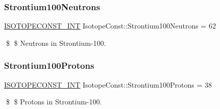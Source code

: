 \subsubsection{\texorpdfstring{Strontium100\+Neutrons}{Strontium100Neutrons}}
{\footnotesize\ttfamily \mbox{\hyperlink{group___isotope_const-_macros_ga5f18360b3e99483a35c32d789e62621c}{I\+S\+O\+T\+O\+P\+E\+C\+O\+N\+S\+T\+\_\+\+I\+NT}} Isotope\+Const\+::\+Strontium100\+Neutrons = 62}

\$ \$ Neutrons in Strontium-\/100. \mbox{\label{group___isotope_const-_strontium-_sr100_ga3984fc5c09d4cc7dc9e5000d4da87e73}} 
\subsubsection{\texorpdfstring{Strontium100\+Protons}{Strontium100Protons}}
{\footnotesize\ttfamily \mbox{\hyperlink{group___isotope_const-_macros_ga5f18360b3e99483a35c32d789e62621c}{I\+S\+O\+T\+O\+P\+E\+C\+O\+N\+S\+T\+\_\+\+I\+NT}} Isotope\+Const\+::\+Strontium100\+Protons = 38}

\$ \$ Protons in Strontium-\/100. 